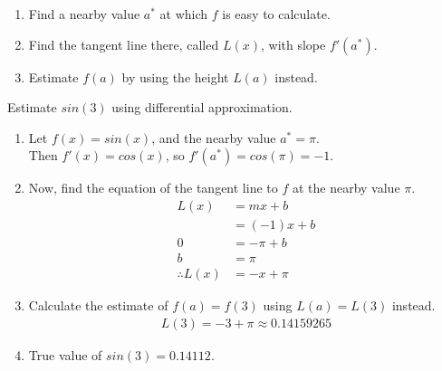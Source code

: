 \begin{enumerate}
    \item
          Find a nearby value $ a^* $ at which $ f $ is easy to calculate. \\

    \item
          Find the tangent line there, called $ L(x) $, with slope $ f'(a^*) $. \\

    \item
          Estimate $ f(a) $ by using the height $ L(a) $ instead. \\
\end{enumerate}

\begin{figure}[H]
    \centering
\end{figure}

\begin{exercise}\nonumber
    Estimate $ sin(3) $ using differential approximation. \\

    \begin{enumerate}
        \item
              Let $ f(x) = sin(x) $, and the nearby value $ a^* = \pi $. \\
              Then $ f'(x) = cos(x) $, so $ f'(a^*) = cos(\pi) = -1 $. \\

        \item
              Now, find the equation of the tangent line to $ f $ at the nearby value $ \pi $.
              \begin{align}
                  L(x)            & = mx + b    \\
                                  & = (-1)x + b \\
                  0               & = -\pi + b  \\
                  b               & = \pi       \\
                  \therefore L(x) & = -x + \pi
              \end{align}

        \item
              Calculate the estimate of $ f(a) = f(3) $ using $ L(a) = L(3) $ instead.
              \begin{gather*}
                  L(3) = -3 + \pi \approx 0.14159265
              \end{gather*}

        \item
              True value of $ sin(3) = 0.14112 $.
    \end{enumerate}
\end{exercise}

